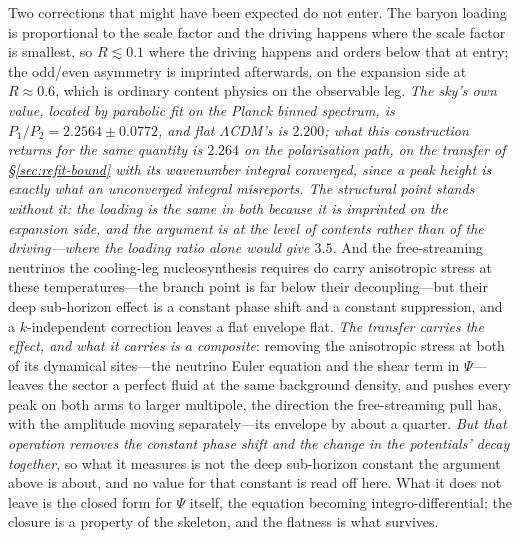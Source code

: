 \documentclass[11pt,a4paper]{article}
\theoremstyle{plain}
\theoremstyle{definition}
\theoremstyle{remark}
\begin{document}
Two corrections that might have been expected do not enter. The baryon loading is proportional to the scale
factor and the driving happens where the scale factor is smallest, so $R\lesssim0.1$ where the driving happens and orders below that at entry; the odd/even asymmetry is imprinted afterwards, on the expansion side at $R\approx0.6$,
which is ordinary content physics on the observable leg. \emph{The sky's own value, located by parabolic fit on the Planck binned spectrum, is $P_1/P_2=2.2564\pm0.0772$, and flat $\Lambda$CDM's is $2.200$; \emph{what this construction returns for the same quantity is $2.264$ on the polarisation path, on the transfer of \S\ref{sec:refit-bound} with its wavenumber integral converged, since a peak height is exactly what an unconverged integral misreports}. \emph{The structural point stands without it}: the loading is the same in both because it is imprinted on the expansion side, and the argument is at the level of contents rather than of the driving---where the loading ratio alone would give $3.5$.} And the free-streaming
neutrinos the cooling-leg nucleosynthesis requires do carry anisotropic stress at these temperatures---the
branch point is far below their decoupling---but their deep sub-horizon effect is a constant phase shift and a
constant suppression, and a $k$-independent correction leaves a flat envelope flat.
\emph{The transfer carries the effect, and what it carries is a composite}: removing the anisotropic
stress at both of its dynamical sites---the neutrino Euler equation and the shear term in $\Psi$---leaves
the sector a perfect fluid at the same background density, and pushes every peak on both arms to larger
multipole, the direction the free-streaming pull has, with the amplitude moving separately---its envelope
by about a quarter. \emph{But that operation removes the constant phase shift and the change in the potentials' decay
together}, so what it measures is not the deep sub-horizon constant the argument above is about, and no
value for that constant is read off
here.
What it does not leave is the closed form for $\Psi$ itself, the equation becoming integro-differential; the
closure is a property of the skeleton, and the flatness is what survives.
\end{document}
